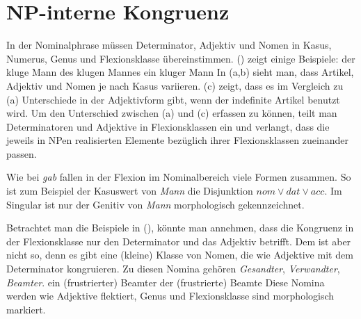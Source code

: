 \section{NP-interne Kongruenz}
\label{sec-np-kongruenz}

In
der Nominalphrase müssen Determinator, Adjektiv und Nomen in Kasus, Numerus, Genus 
und Flexionsklasse übereinstimmen. () zeigt einige Beispiele:
\eal
\ex der kluge  Mann
\ex des klugen Mannes
\ex ein kluger Mann
\zl
In (a,b) sieht man, dass Artikel, Adjektiv und Nomen je nach Kasus variieren. (c)
zeigt, dass es im Vergleich zu (a) Unterschiede in der Adjektivform gibt, wenn
der indefinite Artikel benutzt wird. Um den Unterschied zwischen (a) und (c)
erfassen zu können, teilt man Determinatoren und Adjektive in Flexionsklassen ein und
verlangt, dass die jeweils in NPen realisierten Elemente bezüglich ihrer Flexionsklassen
zueinander passen.

Wie bei \emph{gab} fallen in der Flexion im Nominalbereich viele Formen zusammen.
So ist zum Beispiel der Kasuswert von \emph{Mann} die Disjunktion
$nom \vee dat \vee acc$.
Im Singular ist nur der Genitiv von \emph{Mann} morphologisch gekennzeichnet.

Betrachtet man die Beispiele in (), könnte man annehmen, dass die Kongruenz
in der Flexionsklasse nur den Determinator und das Adjektiv betrifft. Dem ist aber nicht so,
denn es gibt eine (kleine) Klasse von Nomen, die wie Adjektive mit dem Determinator kongruieren.
Zu diesen Nomina gehören \emph{Gesandter}, \emph{Verwandter}, \emph{Beamter}.
\eal
\ex ein (frustrierter) Beamter
\ex der (frustrierte)  Beamte
\zl
Diese Nomina werden wie Adjektive flektiert, Genus und Flexionsklasse sind morphologisch markiert.


